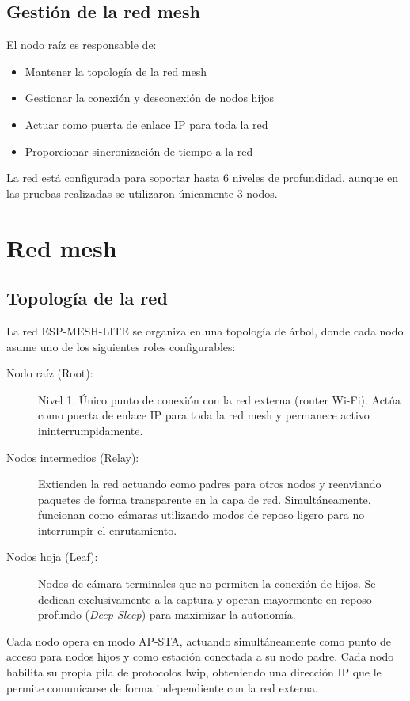 \documentclass[a4paper, 12pt]{report}
\begin{document}
\subsection{Gestión de la red mesh}

El nodo raíz es responsable de:

\begin{itemize}
  \item Mantener la topología de la red mesh
  \item Gestionar la conexión y desconexión de nodos hijos
  \item Actuar como puerta de enlace IP para toda la red
  \item Proporcionar sincronización de tiempo a la red
\end{itemize}

La red está configurada para soportar hasta 6 niveles de profundidad,
aunque en las pruebas realizadas se utilizaron únicamente 3 nodos.

\section{Red mesh}

\subsection{Topología de la red}

La red \gls{ESP-MESH-LITE} se organiza en una topología de árbol, donde cada nodo asume uno de los siguientes roles configurables:

\begin{description}
  \item[Nodo raíz (Root):] Nivel 1. Único punto de conexión con la red externa (router Wi-Fi). Actúa como puerta de enlace IP para toda la red mesh y permanece activo ininterrumpidamente.
  \item[Nodos intermedios (Relay):] Extienden la red actuando como padres para otros nodos y reenviando paquetes de forma transparente en la capa de red. Simultáneamente, funcionan como cámaras utilizando modos de reposo ligero para no interrumpir el enrutamiento.
  \item[Nodos hoja (Leaf):] Nodos de cámara terminales que no permiten la conexión de hijos. Se dedican exclusivamente a la captura y operan mayormente en reposo profundo (\textit{Deep Sleep}) para maximizar la autonomía.
\end{description}

Cada nodo opera en modo \gls{AP-STA}, actuando simultáneamente como
punto de acceso para nodos hijos y como estación conectada a su nodo padre.
Cada nodo habilita su propia pila de protocolos \gls{lwip}, obteniendo una
dirección IP que le permite comunicarse de forma independiente con la red
externa.
\end{document}
